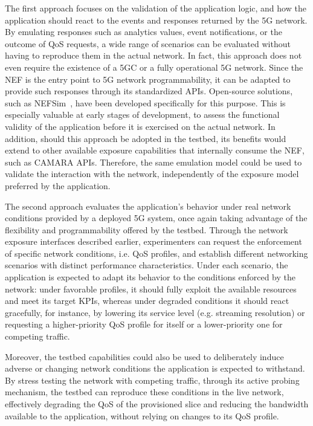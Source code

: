 The first approach focuses on the validation of the application logic, and how the application should react to the events and responses returned by the \acs{5G} network. By emulating responses such as analytics values, event notifications, or the outcome of \acs{QoS} requests, a wide range of scenarios can be evaluated without having to reproduce them in the actual network. In fact, this approach does not even require the existence of a \acs{5GC} or a fully operational \acs{5G} network. Since the \acs{NEF} is the entry point to \acs{5G} network programmability, it can be adapted to provide such responses through its standardized \acsp{API}. Open-source solutions, such as NEFSim~\cite{NEFsim}, have been developed specifically for this purpose. This is especially valuable at early stages of development, to assess the functional validity of the application before it is exercised on the actual network. In addition, should this approach be adopted in the testbed, its benefits would extend to other available exposure capabilities that internally consume the \acs{NEF}, such as CAMARA \acsp{API}. Therefore, the same emulation model could be used to validate the interaction with the network, independently of the exposure model preferred by the application.

The second approach evaluates the application's behavior under real network conditions provided by a deployed \acs{5G} system, once again taking advantage of the flexibility and programmability offered by the testbed. Through the network exposure interfaces described earlier, experimenters can request the enforcement of specific network conditions, i.e. \acs{QoS} profiles, and establish different networking scenarios with distinct performance characteristics. Under each scenario, the application is expected to adapt its behavior to the conditions enforced by the network: under favorable profiles, it should fully exploit the available resources and meet its target \acsp{KPI}, whereas under degraded conditions it should react gracefully, for instance, by lowering its service level (e.g. streaming resolution) or requesting a higher-priority \acs{QoS} profile for itself or a lower-priority one for competing traffic.

Moreover, the testbed capabilities could also be used to deliberately induce adverse or changing network conditions the application is expected to withstand. By stress testing the network with competing traffic, through its active probing mechanism, the testbed can reproduce these conditions in the live network, effectively degrading the \acs{QoS} of the provisioned slice and reducing the bandwidth available to the application, without relying on changes to its \acs{QoS} profile.

